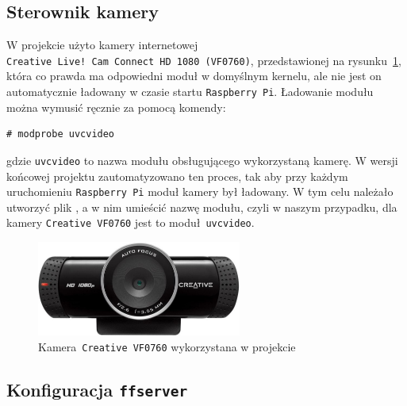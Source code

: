 \documentclass{article}
\begin{document}

\subsection{Sterownik kamery}

W projekcie użyto kamery internetowej \texttt{Creative~Live!~Cam~Connect~HD~1080~(VF0760)}, przedstawionej na rysunku~\ref{fig:creative}, która co prawda ma odpowiedni moduł w domyślnym kernelu, ale nie jest on automatycznie ładowany w czasie startu \texttt{Raspberry~Pi}. Ładowanie modułu można wymusić ręcznie za pomocą komendy:
\begin{verbatim}
# modprobe uvcvideo
\end{verbatim}
gdzie \texttt{uvcvideo} to nazwa modułu obsługującego wykorzystaną kamerę. W wersji końcowej projektu zautomatyzowano ten proces, tak aby przy każdym uruchomieniu \texttt{Raspberry~Pi} moduł kamery był ładowany. W tym celu należało utworzyć plik , a w nim umieścić nazwę modułu, czyli w naszym przypadku, dla kamery \texttt{Creative~VF0760} jest to moduł~\texttt{uvcvideo}.
\begin{figure}[h]
	\centering
	\includegraphics[width=0.6\textwidth]{img/creative}
	\caption{Kamera~\texttt{Creative~VF0760} wykorzystana w projekcie}
	\label{fig:creative}
\end{figure}


\subsection{Konfiguracja \texttt{ffserver}}
\end{document}
